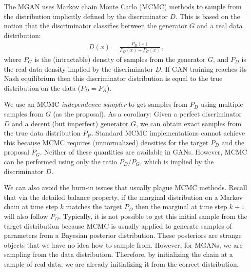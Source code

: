 \documentclass{article}
\begin{document}
The MGAN uses Markov chain Monte Carlo (MCMC) methods to sample from the distribution implicitly defined by the discriminator $D$.
This is based on the notion that the discriminator classifies between the generator $G$ and a real data distribution:
\begin{align}
  D(x) = \frac{P_D(x)}{P_D(x) + P_G(x)}\,,
\end{align}
where $P_G$ is the (intractable) density of samples from the generator $G$, and $P_D$ is the real data density implied by the discriminator $D$.
If GAN training reaches its Nash equilibrium then this discriminator distribution is equal to the true distribution on the data ($P_D = P_R$)\@.  %

We use an MCMC \emph{independence sampler} to get samples from $P_D$ using multiple samples from $G$ (as the proposal)\@.
As a corollary: Given a perfect discriminator $D$ and a decent (but imperfect) generator $G$, we can obtain exact samples from the true data distribution $P_R$.
Standard MCMC implementations cannot achieve this because MCMC requires (unnormalized) densities for the target $P_D$ and the proposal $P_G$.
Neither of these quantities are available in GANs.
However, MCMC can be performed using only the ratio $P_D / P_G$, which is implied by the discriminator $D$.

We can also avoid the burn-in issues that usually plague MCMC methods.
Recall that via the detailed balance property, if the marginal distribution on a Markov chain at time step $k$ matches the target $P_D$ then the marginal at time step $k+1$ will also follow $P_D$.
Typically, it is not possible to get this initial sample from the target distribution because MCMC is usually applied to generate samples of parameters from a Bayesian posterior distribution.
These posteriors are strange objects that we have no idea how to sample from.
However, for MGANs, we are sampling from the data distribution.
Therefore, by initializing the chain at a sample of real data, we are already initializing it from the correct distribution.
\end{document}
